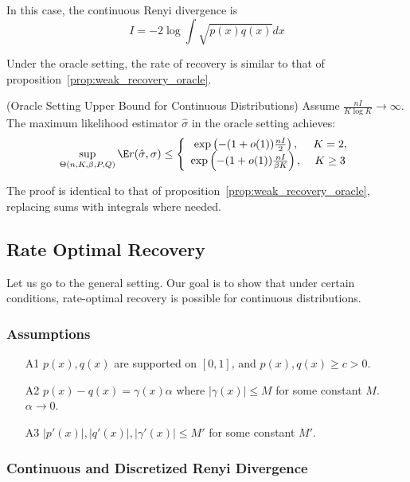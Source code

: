 \documentclass{article}
\begin{document}
In this case, the continuous Renyi divergence is 
\[
I = -2 \log \int \sqrt{p(x)q(x)} dx 
\]

Under the oracle setting, the rate of recovery is similar to that of proposition~\ref{prop:weak_recovery_oracle}. 
\begin{proposition} 
\label{prop:weak_recovery_oracle_continuous}
(Oracle Setting Upper Bound for Continuous Distributions)
Assume $\frac{n I}{K \log K} \rightarrow \infty$. The maximum likelihood estimator $\hat{\sigma}$ in the oracle setting achieves:
\[
\sup_{\Theta(n, K, \beta, P, Q)} \E r(\hat{\sigma}, \sigma) \leq \left\{ 
    \begin{array}{cc} 
   \exp \left( - (1 + o(1)) \frac{nI}{2} \right ), \, & K=2, \\
   \exp \left( - (1 + o(1)) \frac{nI}{\beta K} \right ), \,& K\geq 3
  \end{array} \right. 
\]   
\end{proposition}
The proof is identical to that of proposition~\ref{prop:weak_recovery_oracle}, replacing sums with integrals where needed. 


\subsection{Rate Optimal Recovery}

Let us go to the general setting. Our goal is to show that under certain conditions, rate-optimal recovery is possible for continuous distributions.

\subsubsection{Assumptions}
\label{sec:continuous_assumptions}

\begin{enumerate}
\item[A1] $p(x), q(x)$ are supported on $[0,1]$, and $p(x), q(x) \geq c > 0$. 
\item[A2] $p(x) - q(x) = \gamma(x) \alpha$ where $|\gamma(x)| \leq M$ for some constant $M$. $\alpha \rightarrow 0$.
\item[A3] $|p'(x)|, |q'(x)|, |\gamma'(x)| \leq M'$ for some constant $M'$. 
\end{enumerate}

\subsubsection{Continuous and Discretized Renyi Divergence}
\end{document}

